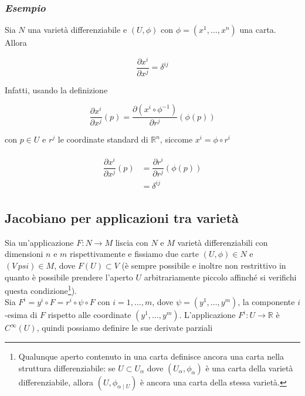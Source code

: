 \subsubsection{\textit{Esempio}}

Sia $ N $ una varietà differenziabile e $ (U,\phi) $ con $ \phi = (x^{1},\dots,x^{n}) $ una carta.\\
Allora

\begin{equation}
	\dfrac{\partial x^{i}}{\partial x^{j}} = \delta^{ij}
\end{equation}

Infatti, usando la definizione

\begin{equation}
	\dfrac{\partial x^{i}}{\partial x^{j}} (p) = \dfrac{\partial (x^{i} \circ \phi^{-1})}{\partial r^{j}} (\phi(p))
\end{equation}

con $ p \in U $ e $ r^{j} $ le coordinate standard di $ \mathbb{R}^{n} $, siccome $ x^{i} = \phi \circ r^{i} $

\begin{align}
	\begin{split}
		\dfrac{\partial x^{i}}{\partial x^{j}} (p) &= \dfrac{\partial r^{i}}{\partial r^{j}} (\phi(p))\\
		&= \delta^{ij}
	\end{split}
\end{align}

\subsection{Jacobiano per applicazioni tra varietà}

Sia un'applicazione $ F : N \to M $ liscia con $ N $ e $ M $ varietà differenziabili con dimensioni $ n $ e $ m $ rispettivamente e fissiamo due carte $ (U,\phi) \in N $ e $ (V\,psi) \in M $, dove $ F(U) \subset V $ (è sempre possibile e inoltre non restrittivo in quanto è possibile prendere l'aperto $ U $ arbitrariamente piccolo affinché si verifichi questa condizione\footnote{%
	Qualunque aperto contenuto in una carta definisce ancora una carta nella struttura differenziabile: se $ U \subset U_{\alpha} $ dove $ (U_{\alpha},\phi_{\alpha}) $ è una carta della varietà differenziabile, allora $ (U, \phi_{\alpha \mid U}) $ è ancora una carta della stessa varietà.%
}).\\
Sia $ F^{i} = y^{i} \circ F = r^{i} \circ \psi \circ F $ con $ i=1,\dots,m $, dove $ \psi = (y^{1},\dots,y^{m}) $, la componente $ i $-esima di $ F $ rispetto alle coordinate $ (y^{1},\dots,y^{m}) $. L'applicazione $ F^{i} : U \to \mathbb{R} $ è $ C^{\infty}(U) $, quindi possiamo definire le sue derivate parziali


